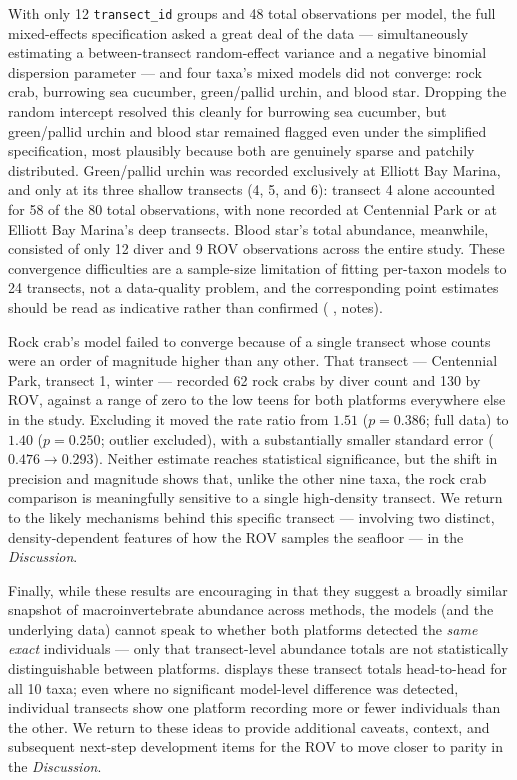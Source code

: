 \documentclass[11pt]{article}
\newcommand{\boxedref}[2]{%
	\begingroup
	\setlength{\fboxrule}{0.8pt}%
	\setlength{\fboxsep}{1.5pt}%
	\textcolor{linkcyan}{%
		\fbox{%
			\textcolor{black}{%
				\hyperref[#2]{#1~\ref*{#2}}%
			}%
		}%
	}%
	\endgroup
}
\newcommand{\figref}[1]{\boxedref{Fig.}{#1}}\newcommand{\tabref}[1]{\boxedref{Table}{#1}}
\begin{document}
With only 12 \texttt{transect\_id} groups and 48 total observations per model,
the full mixed-effects specification asked a great deal of the data ---
simultaneously estimating a between-transect random-effect variance and a
negative binomial dispersion parameter --- and four taxa's mixed models did
not converge: rock crab, burrowing sea cucumber, green/pallid urchin,
and blood star.
Dropping the random intercept resolved this cleanly for burrowing sea
cucumber, but green/pallid urchin and blood star remained flagged even under
the simplified specification, most plausibly because both are genuinely
sparse and patchily distributed.
Green/pallid urchin was recorded exclusively at Elliott Bay Marina, and only
at its three shallow transects (4, 5, and 6): transect 4 alone accounted for
58 of the 80 total observations, with none recorded at Centennial Park or at
Elliott Bay Marina's deep transects.
Blood star's total abundance, meanwhile, consisted of only 12 diver and 9 ROV
observations across the entire study.
These convergence difficulties are a sample-size limitation of fitting
per-taxon models to 24 transects, not a data-quality problem, and the
corresponding point estimates should be read as indicative rather than
confirmed (\tabref{tab:abundance_models}, notes).

Rock crab's model failed to converge because of a single transect whose counts
were an order of magnitude higher than any other.
That transect --- Centennial Park, transect 1, winter --- recorded 62 rock
crabs by diver count and 130 by ROV, against a range of zero to the low teens
for both platforms everywhere else in the study.
Excluding it moved the rate ratio from $1.51$ ($p=0.386$; full data) to $1.40$
($p=0.250$; outlier excluded), with a substantially smaller standard error
($0.476 \rightarrow 0.293$).
Neither estimate reaches statistical significance, but the shift in precision
and magnitude shows that, unlike the other nine taxa, the rock crab comparison
is meaningfully sensitive to a single high-density transect.
We return to the likely mechanisms behind this specific transect --- involving
two distinct, density-dependent features of how the ROV samples the seafloor
--- in the \textit{Discussion}.

Finally, while these results are encouraging in that they suggest a broadly
similar snapshot of macroinvertebrate abundance across methods, the models
(and the underlying data) cannot speak to whether both platforms detected the
\textit{same exact} individuals --- only that transect-level abundance totals 
are not statistically distinguishable between platforms.
\figref{fig:abundance_head-to-head} displays these transect totals
head-to-head for all 10 taxa; even where no significant model-level
difference was detected, individual transects show one platform recording
more or fewer individuals than the other.
We return to these ideas to provide additional caveats, context, and subsequent 
next-step development items for the ROV to move closer to parity in the 
\textit{Discussion}. 
\end{document}
